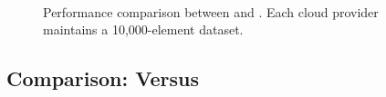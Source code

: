 \begin{figure}[tbp] \centering
{}\\ 
\caption[Comparison between \sia and \pia.]{Performance 
  comparison between \sia and \pia.
  Each cloud provider maintains a 10,000-element dataset.}
\label{fig-compare}
\end{figure}


\subsection{Comparison: \sia Versus \pia}
\label{subsec-compare}

